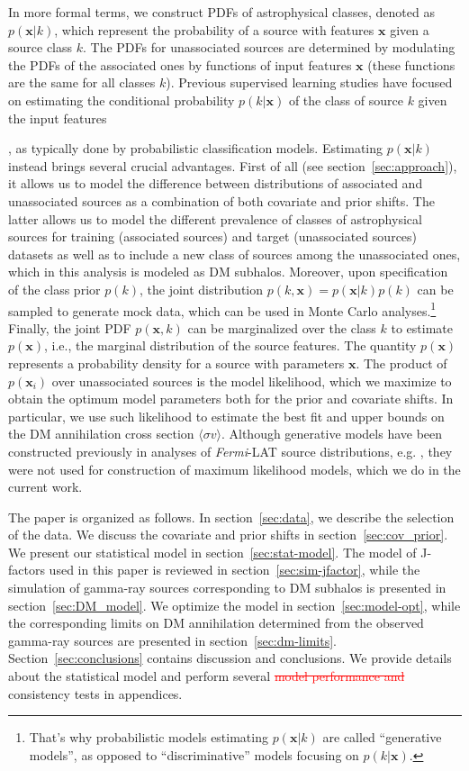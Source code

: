 \documentclass[12pt, a4paper]{article}
\newcommand{\old}[1]{\textcolor{red}{\st{#1}}}
\newcommand{\Fermi}{\textsl{Fermi}}
\newcommand{\bx}{\textbf{x}}
\newcommand{\sigmav}{\langle \sigma v \rangle}
\newcommand{\FermiMLclassif}{
\cite{Fermi-LAT:2011sla,2016ApJ...825...69M,2016ApJ...820....8S,Lefaucheur:2017ajt,2019JCAP...11..045C,2020MNRAS.492.5377L,2020MNRAS.495.1093H,2021RAA....21...15Z,2021MNRAS.505.5853G,Bhat:2022,2023JCAP...07..033B,2023MNRAS.521.6195M,2023RASTI...2..735M,2023MNRAS.520.1348G}}
\begin{document}
In more formal terms, 
we construct PDFs of astrophysical classes, denoted as $p(\bx|k)$,
which represent the probability of a source with features $\bx$ given a source class $k$. 
The PDFs for unassociated sources are determined by modulating the PDFs of the associated ones by functions of input features $\bx$ (these functions are the same for all classes $k$).
Previous supervised learning studies have focused on estimating the conditional probability $p(k|\bx)$ of the class of source $k$ given the input features 
\FermiMLclassif, as typically done by probabilistic classification models.
Estimating $p(\bx|k)$ instead brings several crucial advantages. First of all (see section~\ref{sec:approach}), it allows us to model the difference between distributions of associated and unassociated sources as a combination of both covariate and prior shifts.
The latter allows us to model the different prevalence of classes of astrophysical sources for training (associated sources) and target (unassociated sources) datasets as well as to include a new class of sources among the unassociated ones, which in this analysis is modeled as DM subhalos.
Moreover, upon specification of the class prior $p(k)$, the joint distribution $p(k,\bx)=p(\bx|k)p(k)$ can be sampled to generate mock data, which can be used in Monte Carlo analyses.\footnote{That's why probabilistic models estimating $p(\bx|k)$ are called ``generative models'', as opposed to ``discriminative'' models focusing on $p(k|\bx)$.} Finally, the joint PDF  $p(\bx, k)$ can be marginalized over the class $k$ to estimate $p(\bx)$, i.e., the marginal distribution of the source features. 
The quantity $p(\bx)$
represents a probability density for a source with parameters $\bx$. 
The product of $p(\bx_i)$ over unassociated sources is the model likelihood, which we maximize to obtain the optimum model parameters both for the prior and covariate shifts.
In particular, we use such likelihood to estimate the best fit and upper bounds on the DM annihilation cross section $\sigmav$.
Although generative models have been constructed previously in analyses of \Fermi-LAT source distributions, e.g. \cite{2023MNRAS.520.1348G}, they were not used for construction of maximum likelihood models, which we do in the current work.

The paper is organized as follows.
In section~\ref{sec:data},
we describe the selection of the data.
We discuss the covariate and prior shifts in section~\ref{sec:cov_prior}. We present our statistical model in section~\ref{sec:stat-model}. 
The model of J-factors used in this paper is reviewed in section~\ref{sec:sim-jfactor}, while the simulation of gamma-ray sources corresponding to DM subhalos is presented in section~\ref{sec:DM_model}. 
We optimize the model in section~\ref{sec:model-opt}, while
the corresponding limits on DM annihilation determined from the observed gamma-ray sources are presented in section~\ref{sec:dm-limits}.
Section~\ref{sec:conclusions} contains discussion and conclusions. 
We provide details about the statistical model and
perform several \old{model performance and} consistency tests in appendices.
\end{document}
